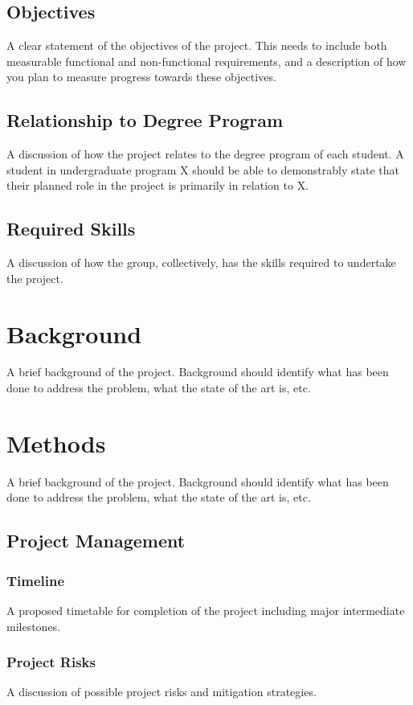 \documentclass[12pt]{report}
\begin{document}
\section{Objectives}
 A clear statement of the objectives of the project. This needs to include both measurable functional and non-functional requirements, and a description of how you plan to measure progress towards these objectives.
 
\section{Relationship to Degree Program}
A discussion of how the project relates to the degree program of each student. A student in undergraduate program X should be able to demonstrably state that their planned role in the project is primarily in relation to X.

\section{Required Skills}
A discussion of how the group, collectively, has the skills required to undertake the project.

\chapter{Background}
A brief background of the project. Background should identify what has been done to address the problem, what the state of the art is, etc.
 
\chapter{Methods}
 A brief background of the project. Background should identify what has been done to address the problem, what the state of the art is, etc.
\section{Project Management}
\subsection{Timeline}
A proposed timetable for completion of the project including major intermediate milestones.

\subsection{Project Risks}
A discussion of possible project risks and mitigation strategies.
\end{document}

